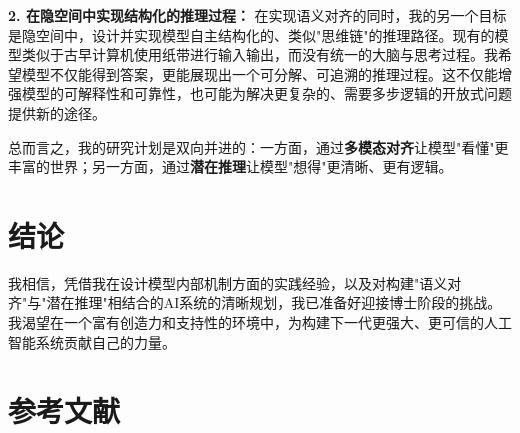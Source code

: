 \documentclass[11pt, letterpaper]{article}
\begin{document}
\textbf{2. 在隐空间中实现结构化的推理过程：} 在实现语义对齐的同时，我的另一个目标是隐空间中，设计并实现模型自主结构化的、类似"思维链"的推理路径。现有的模型类似于古早计算机使用纸带进行输入输出，而没有统一的大脑与思考过程。我希望模型不仅能得到答案，更能展现出一个可分解、可追溯的推理过程。这不仅能增强模型的可解释性和可靠性，也可能为解决更复杂的、需要多步逻辑的开放式问题提供新的途径。

总而言之，我的研究计划是双向并进的：一方面，通过\textbf{多模态对齐}让模型"看懂"更丰富的世界；另一方面，通过\textbf{潜在推理}让模型"想得"更清晰、更有逻辑。

\section{结论}

我相信，凭借我在设计模型内部机制方面的实践经验，以及对构建"语义对齐"与"潜在推理"相结合的AI系统的清晰规划，我已准备好迎接博士阶段的挑战。我渴望在一个富有创造力和支持性的环境中，为构建下一代更强大、更可信的人工智能系统贡献自己的力量。

\section*{参考文献}


\end{document}
